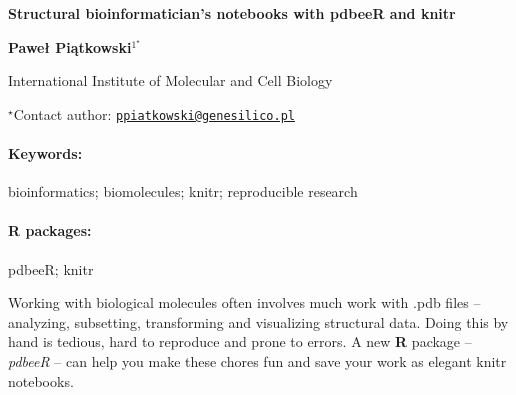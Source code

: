 \documentclass[11pt, a4paper]{article}
\renewcommand{\title}[1]{\begin{center}{\bf \LARGE #1}\end{center}}
\newcommand{\keywords}{\paragraph{Keywords:}}
\newcommand{\packages}{\paragraph{R packages:}}
\begin{document}
\pagestyle{empty}

\title{Structural bioinformatician's notebooks with pdbeeR and knitr}

\begin{center}
  {\bf Paweł Piątkowski$^{1^\star}$}
\end{center}

\vskip 0.3cm

\begin{affiliations}
\begin{enumerate}
\begin{minipage}{0.915\textwidth}
\centering
\item International Institute of Molecular and Cell Biology \\[-2pt]
\end{minipage}
\end{enumerate}
$^\star$Contact author: \href{mailto:ppiatkowski@genesilico.pl}{\nolinkurl{ppiatkowski@genesilico.pl}}\\
\end{affiliations}

\vskip 0.5cm

\begin{minipage}{0.915\textwidth}
\keywords bioinformatics; biomolecules; knitr; reproducible research
\packages pdbeeR; knitr
\end{minipage}

\vskip 0.8cm

Working with biological molecules often involves much work with .pdb
files -- analyzing, subsetting, transforming and visualizing structural
data. Doing this by hand is tedious, hard to reproduce and prone to
errors. A new \textbf{R} package -- \emph{pdbeeR} -- can help you make
these chores fun and save your work as elegant knitr notebooks.
\end{document}
